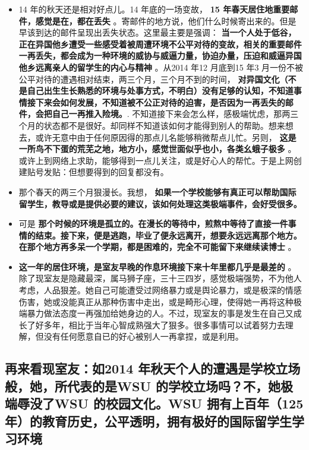 \documentclass[9pt, b5paper]{article}
\begin{document}
\begin{itemize}
\item 14 年的秋天还是相对好点儿。14 年底的一场变故， \textbf{15 年春天居住地重要邮件，感觉是在，都在丢失} 。寄邮件的地方说，他们什么时候寄出来的。但是早该到达的邮件呈现出丢失状态。这里最主要是强调： \textbf{当一个人处于低谷，正在异国他乡遭受一些感受着被周遭环境不公平对待的变故，相关的重要邮件一再丢失，都会成为一种环境的威协与威逼力量，协迫办量，压迫和威逼异国他乡远离亲人的留学生的内心与精神} 。从2014 年12 月底到15 年3 月一份不被公平对待的遭遇相对结束，两三个月，三个月不到的时间， \textbf{对异国文化（不是自己出生生长熟悉的环境与处事方式，不明白）没有足够的认知，不知道事情接下来会如何发展，不知道被不公正对待的迫害，是否因为一再丢失的邮件，会把自己一再推入险境。}. 不知道接下来会怎么样，感极端忧虑，那两三个月的状态都不是很好。却同样不知道该如何才能得到别人的帮助。想来想去，或许无意中由于任何原因得的那点儿名能够稍微帮点儿忙。另则， \textbf{这是一所鸟不下蛋的荒芜之地，地方小，感觉世面似乎也小，各类幺蛾子极多} 。或许上到网络上求助，能够得到一点儿关注，或是好心人的帮忙。于是上网创建贴号发贴：但想要得到的回复都没有。
\item 那个春天的两三个月狠漫长。我想， \textbf{如果一个学校能够有真正可以帮助国际留学生，教导或是提供必要的建议，该如何处理这类极端事件，会好受很多。}
\item 可是 \textbf{那个时候的环境是孤立的。在漫长的等待中，煎熬中等待了直接一件事情的结束。接下来，便是逃跑，毕业了便永远离开，想要永远远离那个地方。在那个地方再多呆一个学期，都是困难的，完全不可能留下来继续读博士} 。
\item \textbf{这一年的居住环境，是室友早晚的作息环境接下来十年里都几乎是最差的} 。除了现室友是隐藏最深，属马狮子座，三十三四岁，感觉极端强势，不为他人考虑，人品狠差。她自己可能遭受过网络暴力或是舆论暴力，或是极深的情感伤害，她或没能真正从那种伤害中走出，或是畸形心理，使得她一再将这种极端暴力做法态度一再强加给她身边的人。不过，现室友的事是发生在自己又成长了好多年，相比于当年心智成熟强大了狠多。很多事情可以试着努力去理解，但没有任何愿意自已的好心被别人一再拿捏，或是利用。
\end{itemize}

\subsection{再来看现室友：如2014 年秋天个人的遭遇是学校立场般，她，所代表的是WSU 的学校立场吗？不，她极端辱没了WSU 的校园文化。WSU 拥有上百年（125 年）的教育历史，公平透明，拥有极好的国际留学生学习环境}
\label{sec-3-2}
\end{document}
